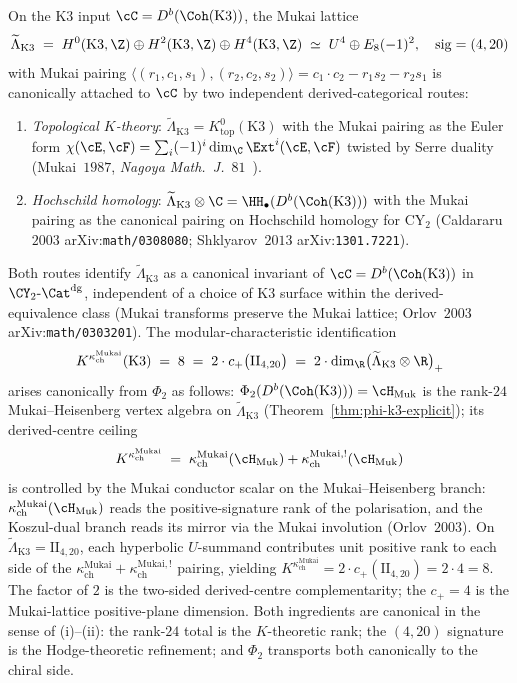 \begin{remark}
\label{rem:mukai-canonicality}
On the K$3$ input $\cC = D^b(\Coh(\mathrm{K3}))$, the Mukai lattice
\[
 \widetilde{\Lambda}_{\mathrm{K3}} \;=\; H^0(\mathrm{K3}, \Z) \oplus H^2(\mathrm{K3}, \Z) \oplus H^4(\mathrm{K3}, \Z) \;\simeq\; U^4 \oplus E_8(-1)^2, \quad \mathrm{sig} = (4, 20)
\]
with Mukai pairing $\langle (r_1, c_1, s_1), (r_2, c_2, s_2) \rangle = c_1 \cdot c_2 - r_1 s_2 - r_2 s_1$ is canonically attached to $\cC$ by two independent derived-categorical routes:
\begin{enumerate}[label=\textup{(\roman*)}]
 \item \emph{Topological $K$-theory}: $\widetilde{\Lambda}_{\mathrm{K3}} = K^0_{\mathrm{top}}(\mathrm{K3})$ with the Mukai pairing as the Euler form $\chi(\cE, \cF) = \sum_i (-1)^i \dim_\C \Ext^i(\cE, \cF)$ twisted by Serre duality (Mukai~$1987$, \textit{Nagoya Math.~J.}~$81$~\cite{Mukai1987}).
 \item \emph{Hochschild homology}: $\widetilde{\Lambda}_{\mathrm{K3}} \otimes \C = \HH_\bullet(D^b(\Coh(\mathrm{K3})))$ with the Mukai pairing as the canonical pairing on Hochschild homology for CY$_2$ (Caldararu~$2003$ arXiv:\texttt{math/0308080}; Shklyarov~$2013$ arXiv:\texttt{1301.7221}).
\end{enumerate}
Both routes identify $\widetilde{\Lambda}_{\mathrm{K3}}$ as a canonical invariant of $\cC = D^b(\Coh(\mathrm{K3}))$ in $\CY_2\text{-}\Cat^{\mathrm{dg}}$, independent of a choice of K$3$ surface within the derived-equivalence class (Mukai transforms preserve the Mukai lattice; Orlov~$2003$ arXiv:\texttt{math/0303201}). The modular-characteristic identification
\[
 K^{\kappa_{\mathrm{ch}}^{\mathrm{Mukai}}}(\mathrm{K3}) \;=\; 8 \;=\; 2 \cdot c_+\bigl(\mathrm{II}_{4,20}\bigr) \;=\; 2 \cdot \dim_\R\bigl(\widetilde{\Lambda}_{\mathrm{K3}} \otimes \R\bigr)_+
\]
arises canonically from $\Phi_2$ as follows: $\Phi_2(D^b(\Coh(\mathrm{K3}))) = \cH_{\mathrm{Muk}}$ is the rank-$24$ Mukai--Heisenberg vertex algebra on $\widetilde{\Lambda}_{\mathrm{K3}}$ (Theorem~\ref{thm:phi-k3-explicit}); its derived-centre ceiling
\[
 K^{\kappa_{\mathrm{ch}}^{\mathrm{Mukai}}} \;=\; \kappa_{\mathrm{ch}}^{\mathrm{Mukai}}(\cH_{\mathrm{Muk}}) + \kappa_{\mathrm{ch}}^{\mathrm{Mukai},!}(\cH_{\mathrm{Muk}})
\]
is controlled by the Mukai conductor scalar on the Mukai--Heisenberg branch: $\kappa_{\mathrm{ch}}^{\mathrm{Mukai}}(\cH_{\mathrm{Muk}})$ reads the positive-signature rank of the polarisation, and the Koszul-dual branch reads its mirror via the Mukai involution (Orlov~$2003$). On $\widetilde{\Lambda}_{\mathrm{K3}} = \mathrm{II}_{4, 20}$, each hyperbolic $U$-summand contributes unit positive rank to each side of the $\kappa_{\mathrm{ch}}^{\mathrm{Mukai}} + \kappa_{\mathrm{ch}}^{\mathrm{Mukai},!}$ pairing, yielding $K^{\kappa_{\mathrm{ch}}^{\mathrm{Mukai}}} = 2 \cdot c_+(\mathrm{II}_{4,20}) = 2 \cdot 4 = 8$. The factor of $2$ is the two-sided derived-centre complementarity; the $c_+ = 4$ is the Mukai-lattice positive-plane dimension. Both ingredients are canonical in the sense of \textup{(i)--(ii)}: the rank-$24$ total is the $K$-theoretic rank; the $(4, 20)$ signature is the Hodge-theoretic refinement; and $\Phi_2$ transports both canonically to the chiral side.

\end{remark}
